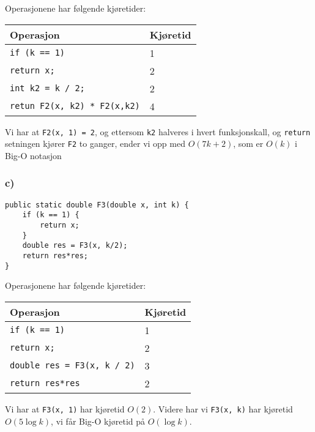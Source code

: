 \documentclass{article}
\begin{document}
    \begin{ans}
        Operasjonene har følgende kjøretider:

        \begin{table}[H]
            \begin{center}
                \begin{tabular}[c]{|l|l|}
                    \hline
                    Operasjon & Kjøretid  \\
                    \hline
                     \texttt{if (k == 1)}& 1  \\
                     \texttt{return x;} & 2  \\
                     \texttt{int k2 = k / 2;}& 2 \\
                     \texttt{retun F2(x, k2) * F2(x,k2)}& 4  \\
                    \hline
                \end{tabular}
            \end{center}
        \end{table}
    
        Vi har at \texttt{F2(x, 1) = 2}, og ettersom \texttt{k2} halveres i hvert funksjonskall, og \texttt{return} setningen kjører \texttt{F2} to ganger, ender vi opp med \( O(7k + 2) \), som er \( O(k) \) i Big-O notasjon
    \end{ans}

    \subsubsection{c)}
    \begin{lstlisting}
public static double F3(double x, int k) {
    if (k == 1) {
        return x;
    }
    double res = F3(x, k/2);
    return res*res;
}
    \end{lstlisting}    

    \begin{ans}
Operasjonene har følgende kjøretider:

\begin{table}[H]
    \begin{center}
        \begin{tabular}[c]{|l|l|}
            \hline
             Operasjon& Kjøretid  \\
            \hline
             \texttt{if (k == 1)}& 1  \\
             \texttt{return x;} & 2  \\
             \texttt{double res = F3(x, k / 2)}& 3 \\
             \texttt{return res*res}& 2  \\
            \hline
        \end{tabular}
    \end{center}
\end{table}

Vi har at \texttt{F3(x, 1)} har kjøretid \( O(2) \). Videre har vi \texttt{F3(x, k)} har kjøretid \( O(5\log k)\), vi får Big-O kjøretid på \( O(\log k) \).
    \end{ans}
\end{document}
